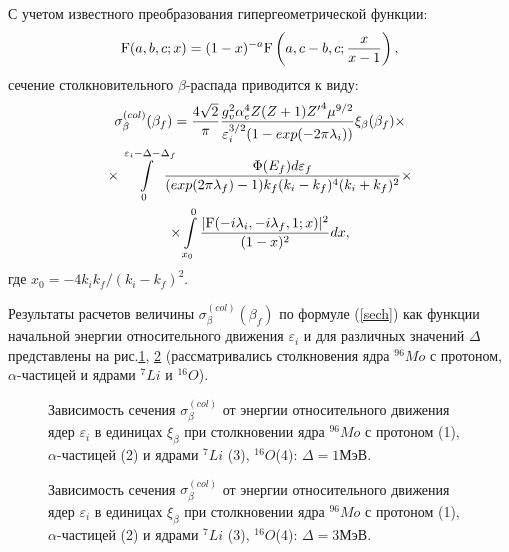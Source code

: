 С учетом известного преобразования гипергеометрической функции:
\begin{eqnarray}
{\rm F}(a,b,c;x)=(1-x)^{-a}{\rm F}\left(a,c-b,c;{x\over{x-1}}\right),\nonumber
\end{eqnarray}
сечение столкновительного $\beta$-распада  приводится к виду:
\begin{multline} \label{sech}
 \sigma^{(col)}_\beta(\beta_f)=
{4\sqrt{2}\over \pi} {{g^2_v\alpha_e^4Z (Z+1) {Z'}^4 \mu^{9/2}}
\over{\varepsilon_i^{3/2} (1-exp(-2\pi\lambda_i))}}
\xi_\beta(\beta_f)
\times\\
\times\int\limits_0^{\varepsilon_i{-}\Delta{-}\Delta_f}\!\!\!\!\!
{{\Phi(E_f) d\varepsilon_f}\over{(exp(2\pi\lambda_f)-1)
k_f ( k_i- k_f)^4(k_i+k_f)^2}}\times\\
\times\int\limits_{x_0}^0 {{|{\rm F}(-i \lambda_i, -i\lambda_f,1; x)|^2}\over{(1-x)^2}} dx,
\end{multline}
где  $x_0=-4 k_i k_f/(k_i- k_f)^2$.


Результаты расчетов величины    $\sigma^{(col)}_\beta(\beta_f)$
по формуле (\ref{sech}) как функции начальной энергии относительного движения
$\varepsilon_i$ и для различных значений $\Delta$  представлены на рис.\ref{MO961}, \ref{MO962}
(рассматривались столкновения ядра $^{96} Mo$ с протоном, $\alpha$-частицей
и ядрами $^7 Li$ и $^{16} O$).

\begin{figure}
\vspace{18 true cm}
\caption{{Зависимость сечения  $\sigma^{(col)}_\beta$ от энергии относительного
движения ядер $\varepsilon_i$ в единицах $\xi_\beta$ при столкновении
ядра ${}^{96}Mo$ с протоном (1), $\alpha$-частицей (2) и ядрами ${}^7 Li$ (3), ${}^{16} O$(4):
$\Delta=1 МэВ$.}}
\label{MO961}
\end{figure}

\begin{figure}
\vspace{18 true cm}
\caption{{ Зависимость сечения  $\sigma^{(col)}_\beta$ от энергии относительного
движения ядер $\varepsilon_i$ в единицах $\xi_\beta$ при столкновении
ядра ${}^{96}Mo$ с протоном (1), $\alpha$-частицей (2) и ядрами ${}^7 Li$ (3), ${}^{16} O$(4):
$\Delta=3 МэВ$.}}
\label{MO962}
\end{figure}


